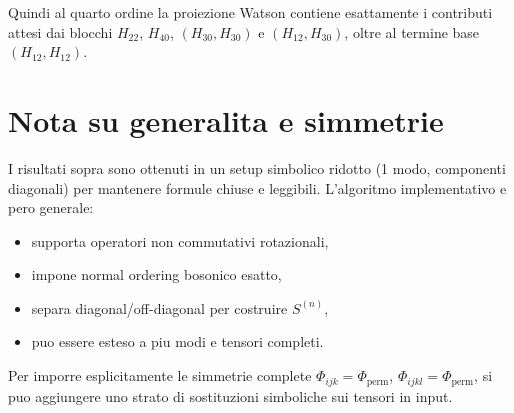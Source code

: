 \documentclass[11pt,a4paper]{article}
\begin{document}
Quindi al quarto ordine la proiezione Watson contiene esattamente i contributi attesi dai blocchi
\(H_{22}\), \(H_{40}\), \((H_{30},H_{30})\) e \((H_{12},H_{30})\), oltre al termine base
\((H_{12},H_{12})\).

\section{Nota su generalita e simmetrie}
I risultati sopra sono ottenuti in un setup simbolico ridotto (1 modo, componenti diagonali)
per mantenere formule chiuse e leggibili. L'algoritmo implementativo e pero generale:
\begin{itemize}
\item supporta operatori non commutativi rotazionali,
\item impone normal ordering bosonico esatto,
\item separa diagonal/off-diagonal per costruire \(S^{(n)}\),
\item puo essere esteso a piu modi e tensori completi.
\end{itemize}

Per imporre esplicitamente le simmetrie complete
\(\Phi_{ijk}=\Phi_{\text{perm}}\), \(\Phi_{ijkl}=\Phi_{\text{perm}}\),
si puo aggiungere uno strato di sostituzioni simboliche sui tensori in input.
\end{document}
